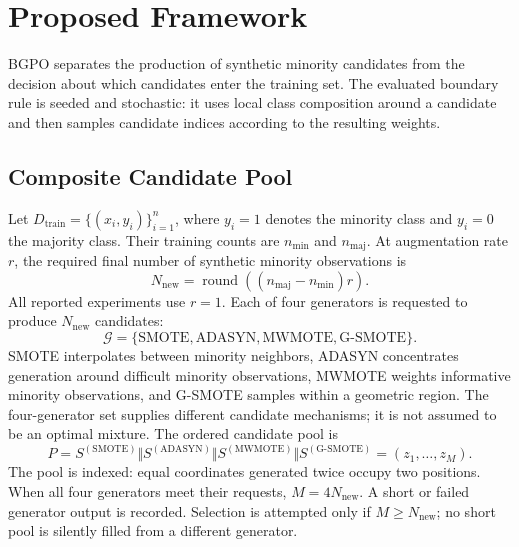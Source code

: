 \section{Proposed Framework}\label{sec:3}

BGPO separates the production of synthetic minority candidates from the decision about which candidates enter the training set. The evaluated boundary rule is seeded and stochastic: it uses local class composition around a candidate and then samples candidate indices according to the resulting weights.

\subsection{Composite Candidate Pool}

Let \(D_{\mathrm{train}}=\{(x_i,y_i)\}_{i=1}^{n}\), where \(y_i=1\) denotes the minority class and \(y_i=0\) the majority class. Their training counts are \(n_{\min}\) and \(n_{\mathrm{maj}}\). At augmentation rate \(r\), the required final number of synthetic minority observations is
\begin{equation}\label{eq:1}
N_{\mathrm{new}}=\operatorname{round}\!\left((n_{\mathrm{maj}}-n_{\min})r\right).
\end{equation}
All reported experiments use \(r=1\). Each of four generators is requested to produce \(N_{\mathrm{new}}\) candidates:
\begin{equation}\label{eq:2}
\mathcal{G}=\{\mathrm{SMOTE},\mathrm{ADASYN},\mathrm{MWMOTE},\mathrm{G\mbox{-}SMOTE}\}.
\end{equation}
SMOTE interpolates between minority neighbors, ADASYN concentrates generation around difficult minority observations, MWMOTE weights informative minority observations, and G-SMOTE samples within a geometric region. The four-generator set supplies different candidate mechanisms; it is not assumed to be an optimal mixture. The ordered candidate pool is
\begin{equation}\label{eq:3}
P=S^{(\mathrm{SMOTE})}\Vert S^{(\mathrm{ADASYN})}\Vert
S^{(\mathrm{MWMOTE})}\Vert S^{(\mathrm{G\mbox{-}SMOTE})}
=(z_1,\ldots,z_M).
\end{equation}
The pool is indexed: equal coordinates generated twice occupy two positions. When all four generators meet their requests, \(M=4N_{\mathrm{new}}\). A short or failed generator output is recorded. Selection is attempted only if \(M\geq N_{\mathrm{new}}\); no short pool is silently filled from a different generator.

